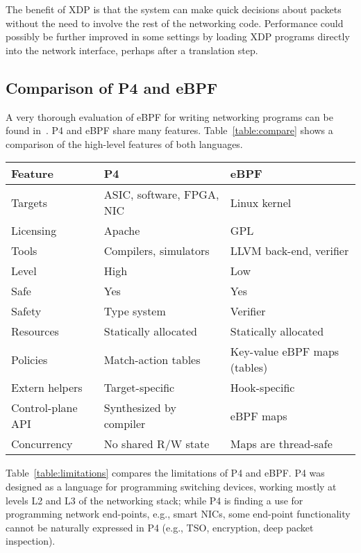 The benefit of XDP is that the system can make quick decisions
about packets without the need to involve the rest of the networking
code. Performance could possibly be further improved in some settings
by loading XDP programs directly into the network interface,
perhaps after a translation step.


\subsection{Comparison of P4 and eBPF}

A very thorough evaluation of eBPF for writing networking programs can
be found in~\cite{minao-hspr18}.  P4 and eBPF share many features.
Table~\ref{table:compare} shows a comparison of the high-level
features of both languages.

\begin{table*}[h]
  \footnotesize
  \begin{center}
  \begin{tabular}{|l|l|l|} \hline
    \textbf{Feature} & \textbf{P4} & \textbf{eBPF} \\ \hline \hline
    Targets & ASIC, software, FPGA, NIC & Linux kernel \\ \hline
    Licensing & Apache & GPL \\ \hline
    Tools & Compilers, simulators & LLVM back-end, verifier \\ \hline
    Level & High & Low \\ \hline
    Safe  & Yes & Yes \\ \hline
    Safety & Type system & Verifier \\ \hline
    Resources & Statically allocated & Statically allocated \\ \hline
    Policies & Match-action tables & Key-value eBPF maps (tables) \\ \hline
    Extern helpers & Target-specific & Hook-specific \\ \hline
    Control-plane API & Synthesized by compiler & eBPF maps \\ \hline
    Concurrency & No shared R/W state & Maps are thread-safe \\ \hline
  \end{tabular}
  \caption{Feature comparison between P4 and eBPF.}\label{table:compare}
  \end{center}
\end{table*}

Table~\ref{table:limitations} compares the limitations of P4 and eBPF.
P4 was designed as a language for programming switching devices,
working mostly at levels L2 and L3 of the networking stack; while P4
is finding a use for programming network end-points, e.g., smart NICs,
some end-point functionality cannot be naturally expressed in P4
(e.g., TSO, encryption, deep packet inspection).

